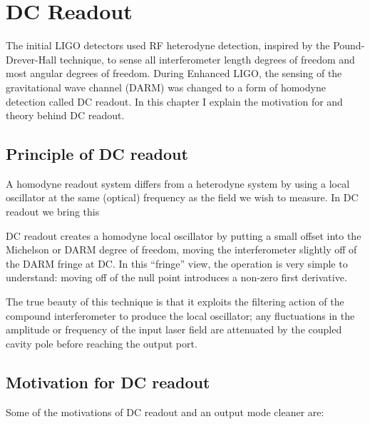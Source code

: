 \chapter{DC Readout}
\label{chapter3}

The initial LIGO detectors used RF heterodyne detection, inspired by
the Pound-Drever-Hall technique, to sense all interferometer length
degrees of freedom and most angular degrees of freedom.  During
Enhanced LIGO, the sensing of the gravitational wave channel (DARM)
was changed to a form of homodyne detection called DC readout.  In
this chapter I explain the motivation for and theory behind DC
readout.

\section{Principle of DC readout}
A homodyne readout system differs from a heterodyne system by using a
local oscillator at the same (optical) frequency as the field we wish
to measure.  In DC readout we bring this 

DC readout creates a homodyne local oscillator by putting a small
offset into the Michelson or DARM degree of freedom, moving the
interferometer slightly off of the DARM fringe at DC.  In this
``fringe'' view, the operation is very simple to understand: moving
off of the null point introduces a non-zero first derivative.  

The true beauty of this technique is that it exploits the filtering
action of the compound interferometer to produce the local oscillator;
any fluctuations in the amplitude or frequency of the input laser
field are attenuated by the coupled cavity pole before reaching the
output port.

\section{Motivation for DC readout}

Some of the motivations of DC readout and an output mode cleaner are:

